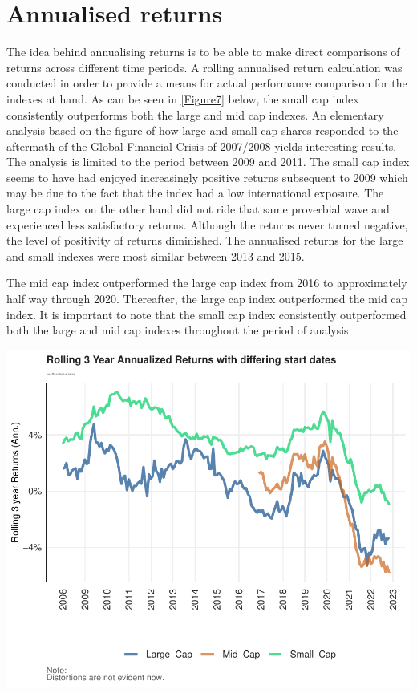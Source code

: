 \documentclass[11pt,preprint, authoryear]{elsarticle}
\let\origfigure\figure
\let\endorigfigure\endfigure
\renewenvironment{figure}[1][2] {
    \expandafter\origfigure\expandafter[H]
} {
    \endorigfigure
}
\numberwithin{equation}{section}
\numberwithin{figure}{section}
\numberwithin{table}{section}
\begin{document}
\hypertarget{annualised-returns}{%
\section{\texorpdfstring{Annualised returns
\label{Returns}}{Annualised returns }}\label{annualised-returns}}

The idea behind annualising returns is to be able to make direct
comparisons of returns across different time periods. A rolling
annualised return calculation was conducted in order to provide a means
for actual performance comparison for the indexes at hand. As can be
seen in \ref{Figure7} below, the small cap index consistently
outperforms both the large and mid cap indexes. An elementary analysis
based on the figure of how large and small cap shares responded to the
aftermath of the Global Financial Crisis of 2007/2008 yields interesting
results. The analysis is limited to the period between 2009 and 2011.
The small cap index seems to have had enjoyed increasingly positive
returns subsequent to 2009 which may be due to the fact that the index
had a low international exposure. The large cap index on the other hand
did not ride that same proverbial wave and experienced less satisfactory
returns. Although the returns never turned negative, the level of
positivity of returns diminished. The annualised returns for the large
and small indexes were most similar between 2013 and 2015.

The mid cap index outperformed the large cap index from 2016 to
approximately half way through 2020. Thereafter, the large cap index
outperformed the mid cap index. It is important to note that the small
cap index consistently outperformed both the large and mid cap indexes
throughout the period of analysis.

\begin{figure}[H]

{\centering \includegraphics{Volatility-of-Shares_files/figure-latex/Figure7-1} 

}

\caption{Rolling Annualised Returns of the Indexes \label{Figure7}}\label{fig:Figure7}
\end{figure}
\end{document}
